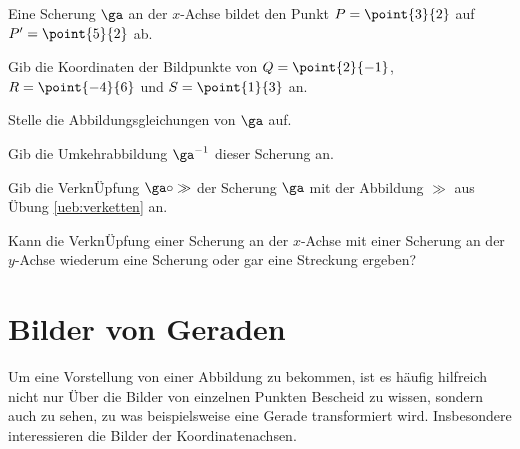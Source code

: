 \documentclass[%
11pt,%
twoside,%
titlepage,%
german,%
headsepline%
]{scrartcl}
\begin{document}
\begin{ueb}
Eine Scherung $\ga$ an der $x$-Achse bildet den Punkt $P =\point{3}{2}$ auf $P' =\point{5}{2}$ ab.
\begin{enumeratea}
\item Gib die Koordinaten der Bildpunkte von $Q=\point{2}{-1}$, $R=\point{-4}{6}$ und $S=\point{1}{3}$ an.
\item Stelle die Abbildungsgleichungen von $\ga$ auf.
\item Gib die Umkehrabbildung $\ga^{-1}$ dieser Scherung an.
\item Gib die Verkn\"Upfung $\ga\circ\gg$ der Scherung $\ga$ mit der Abbildung $\gg$ aus \"Ubung \ref{ueb:verketten} an.
\item Kann die Verkn\"Upfung einer Scherung an der $x$-Achse mit einer Scherung an der $y$-Achse wiederum eine Scherung oder gar eine Streckung ergeben?
\end{enumeratea}
\end{ueb}

\section{Bilder von Geraden}
Um
eine Vorstellung von einer Abbildung zu bekommen, ist es häufig hilfreich nicht nur \"Uber die Bilder von einzelnen Punkten Bescheid zu wissen, sondern auch zu sehen, zu was beispielsweise eine Gerade transformiert wird. Insbesondere interessieren die Bilder der Koordinatenachsen.
\end{document}
